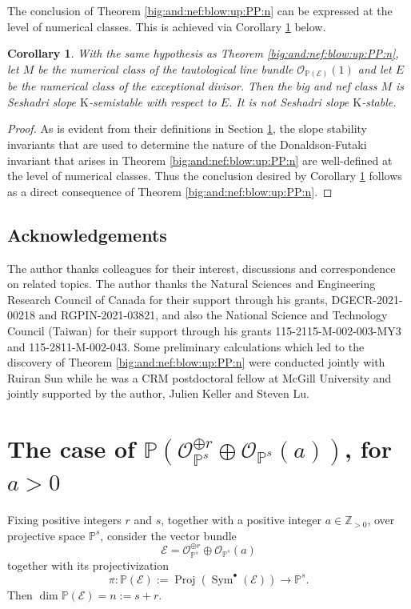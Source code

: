 \documentclass[10pt,letterpaper]{amsart}
\newcommand{\Osh}{{\mathcal O}}                        %
\newcommand{\Sym}{\operatorname{Sym}}
\newcommand{\K}{\mathrm{K}}
\newcommand{\PP}{\mathbb{P}} %
\newcommand{\ZZ}{\mathbb{Z}} %
\newtheorem{corollary}[theorem]{Corollary}
\theoremstyle{definition}
\numberwithin{equation}{section}
\begin{document}
The conclusion of Theorem \ref{big:and:nef:blow:up:PP:n} can be expressed at the level of numerical classes.  This is achieved via Corollary \ref{big:and:nef:blow:up:PP:n:cor} below.

\begin{corollary}\label{big:and:nef:blow:up:PP:n:cor}
With the same hypothesis as Theorem \ref{big:and:nef:blow:up:PP:n}, let  $M$ be the numerical class of the tautological line bundle $\Osh_{\PP(\mathcal{E})}(1)$ and let $E$ be the numerical class of the exceptional divisor.  Then the big and nef class $M$ is Seshadri slope $\K$-semistable with respect to $E$.  It is not Seshadri slope $\K$-stable.
\end{corollary}

\begin{proof}
As is evident from their definitions in Section \ref{case:of:PPs:OOr:OOa}, the slope stability invariants that are used to determine the nature of the Donaldson-Futaki invariant that arises in Theorem \ref{big:and:nef:blow:up:PP:n} are well-defined at the level of numerical classes.  Thus the conclusion desired by Corollary \ref{big:and:nef:blow:up:PP:n:cor} follows as a direct consequence of Theorem \ref{big:and:nef:blow:up:PP:n}.
\end{proof}

\subsection*{Acknowledgements}
The author thanks colleagues for their interest, discussions and correspondence on related topics.  The author thanks the Natural Sciences and Engineering Research Council of Canada for their support through his grants, DGECR-2021-00218 and RGPIN-2021-03821, and also the National Science and Technology Council (Taiwan) for their support through his grants 115-2115-M-002-003-MY3 and 115-2811-M-002-043.  Some preliminary calculations which led to the discovery of Theorem \ref{big:and:nef:blow:up:PP:n} were conducted jointly with Ruiran Sun while he was a CRM postdoctoral fellow at McGill University and jointly supported by the author, Julien Keller and Steven Lu. 

\section{The case of $\PP(\Osh_{\PP^s}^{\oplus r} \oplus \Osh_{\PP^s}(a))$, for $a>0$}\label{case:of:PPs:OOr:OOa}

Fixing positive integers $r$ and $s$, together with a positive integer $a \in \ZZ_{>0}$, over projective space $\PP^s$, consider the vector bundle
$$
\mathcal{E} = \Osh_{\PP^s}^{\oplus r} \oplus \Osh_{\PP^s}(a) 
$$
together with its projectivization
$$
\pi \colon \PP(\mathcal{E}) := \operatorname{Proj}\left(\Sym^\bullet(\mathcal{E})\right) \rightarrow \PP^s \text{.}
$$
Then
$\dim \PP(\mathcal{E}) = n := s + r \text{.}$
\end{document}

